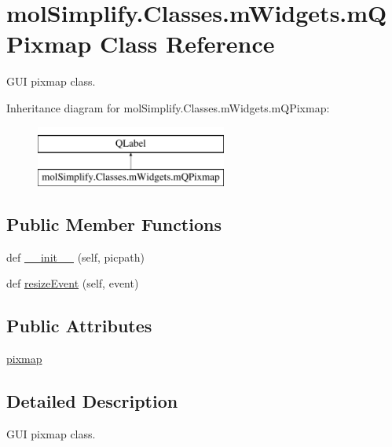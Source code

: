 \hypertarget{classmolSimplify_1_1Classes_1_1mWidgets_1_1mQPixmap}{}\section{mol\+Simplify.\+Classes.\+m\+Widgets.\+m\+Q\+Pixmap Class Reference}
\label{classmolSimplify_1_1Classes_1_1mWidgets_1_1mQPixmap}


G\+UI pixmap class.  


Inheritance diagram for mol\+Simplify.\+Classes.\+m\+Widgets.\+m\+Q\+Pixmap\+:\begin{figure}[H]
\begin{center}
\leavevmode
\includegraphics[height=2.000000cm]{classmolSimplify_1_1Classes_1_1mWidgets_1_1mQPixmap}
\end{center}
\end{figure}
\subsection*{Public Member Functions}
\begin{DoxyCompactItemize}
\item 
def \hyperlink{classmolSimplify_1_1Classes_1_1mWidgets_1_1mQPixmap_aaf933090efd42e5db66472904527163e}{\+\_\+\+\_\+init\+\_\+\+\_\+} (self, picpath)
\item 
def \hyperlink{classmolSimplify_1_1Classes_1_1mWidgets_1_1mQPixmap_a5bc5a8cecbaa770e2020f21c0dc67bcc}{resize\+Event} (self, event)
\end{DoxyCompactItemize}
\subsection*{Public Attributes}
\begin{DoxyCompactItemize}
\item 
\hyperlink{classmolSimplify_1_1Classes_1_1mWidgets_1_1mQPixmap_a375741d56a1de4780e51396e682c89fb}{pixmap}
\end{DoxyCompactItemize}


\subsection{Detailed Description}
G\+UI pixmap class. 


